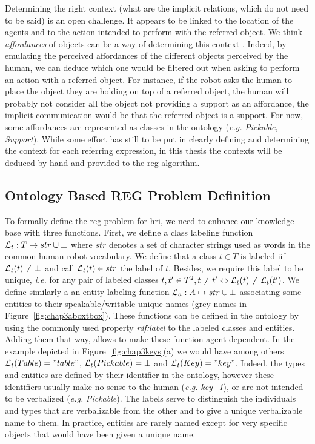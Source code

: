\documentclass[a4paper,11pt,twoside]{StyleThese}
\begin{document}
\begin{enumerate}

Determining the right context (what are the implicit relations, which do not need to be said) is an open challenge. It appears to be linked to the location of the agents and to the action intended to perform with the referred object. We think \textit{affordances} of objects can be a way of determining this context \cite{gibson2014ecological, norman2013design}. Indeed, by emulating the perceived affordances of the different objects perceived by the human, we can deduce which one would be filtered out when asking to perform an action with a referred object. For instance, if the robot asks the human to place the object they are holding on top of a referred object, the human will probably not consider all the object not providing a support as an affordance, the implicit communication would be that the referred object is a support. For now, some affordances are represented as classes in the ontology (\textit{e.g.} \textit{Pickable}, \textit{Support}). While some effort has still to be put in clearly defining and determining the context for each referring expression, in this thesis the contexts will be deduced by hand and provided to the \acrshort{reg} algorithm.

\end{enumerate}

\subsection{Ontology Based REG Problem Definition}
To formally define the \acrshort{reg} problem for \acrshort{hri}, we need to enhance our knowledge base with three functions.
First, we define a class labeling function $\mathcal{L}_t: T \mapsto str \cup \bot$ where $str$ denotes a set of character strings used as words in the common human robot vocabulary. We define that a class $t \in T$ is labeled iif $\mathcal{L}_t(t) \neq \bot$ and call $\mathcal{L}_t(t) \in str$ the label of $t$. Besides, we require this label to be unique, \textit{i.e.} for any pair of labeled classes $t, t' \in T^2, t \neq t' \Leftrightarrow \mathcal{L}_t(t) \neq \mathcal{L}_t(t')$. We define similarly a an entity labeling function $\mathcal{L}_a: A \mapsto str \cup \bot$ associating some entities to their speakable/writable unique names (grey names in Figure~\ref{fig:chap3aboxtbox}). These functions can be defined in the ontology by using the commonly used property \textit{rdf:label} to the labeled classes and entities. Adding them that way, allows to make these function agent dependent. In the example depicted in Figure~\ref{fig:chap3keys}(a) we would have among others $\mathcal{L}_t(Table) = "table"$, $\mathcal{L}_t(Pickable) = \bot$ and $\mathcal{L}_t(Key) = "key"$. Indeed, the types and entities are defined by their identifier in the ontology, however these identifiers usually make no sense to the human (\textit{e.g.} \textit{key\_1}), or are not intended to be verbalized (\textit{e.g.} \textit{Pickable}). The labels serve to distinguish the individuals and types that are verbalizable from the other and to give a unique verbalizable name to them. In practice, entities are rarely named except for very specific objects that would have been given a unique name.
\end{document}
